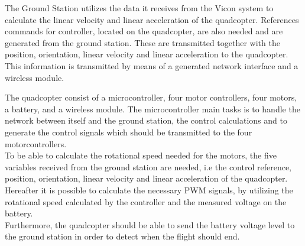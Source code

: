 The Ground Station utilizes the data it receives from the Vicon system to calculate the linear velocity and linear acceleration of the quadcopter. References commands for controller, located on the quadcopter, are also needed and are generated from the ground station. These are transmitted together with the position, orientation, linear velocity and linear acceleration to the quadcopter. This information is transmitted by means of a generated network interface and a wireless module.

The quadcopter consist of a microcontroller, four motor controllers, four motors, a battery, and a wireless module. The microcontroller main tasks is to handle the network between itself and the ground station, the control calculations and to generate the control signals which should be transmitted to the four motorcontrollers. \\To be able to calculate the rotational speed needed for the motors, the five variables received from the ground station are needed, i.e the control reference, position, orientation, linear velocity and linear acceleration of the quadcopter. Hereafter it is possible to calculate the necessary PWM signals, by utilizing the rotational speed calculated by the controller and the measured voltage on the battery. \\Furthermore, the quadcopter should be able to send the battery voltage level to the ground station in order to detect when the flight should end.





